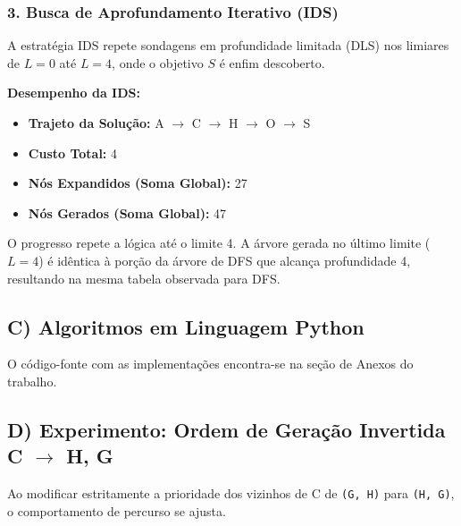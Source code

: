 \subsubsection*{3. Busca de Aprofundamento Iterativo (IDS)}

A estratégia IDS repete sondagens em profundidade limitada (DLS) nos limiares de $L=0$ até $L=4$, onde o objetivo $S$ é enfim descoberto.

\textbf{Desempenho da IDS:}
\begin{itemize}
    \item \textbf{Trajeto da Solução:} A $\rightarrow$ C $\rightarrow$ H $\rightarrow$ O $\rightarrow$ S
    \item \textbf{Custo Total:} 4
    \item \textbf{Nós Expandidos (Soma Global):} 27
    \item \textbf{Nós Gerados (Soma Global):} 47
\end{itemize}

O progresso repete a lógica até o limite 4. A árvore gerada no último limite ($L=4$) é idêntica à porção da árvore de DFS que alcança profundidade 4, resultando na mesma tabela observada para DFS.

\subsection*{C) Algoritmos em Linguagem Python}

O código-fonte com as implementações encontra-se na seção de Anexos do trabalho.

\subsection*{D) Experimento: Ordem de Geração Invertida C $\rightarrow$ H, G}

Ao modificar estritamente a prioridade dos vizinhos de C de \texttt{(G, H)} para \texttt{(H, G)}, o comportamento de percurso se ajusta. 

